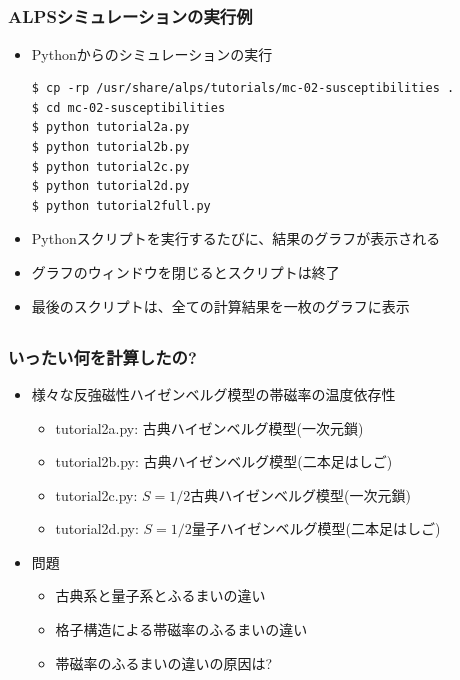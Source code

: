 \subsection*{\redm\whiteb\greenb}
\begin{frame}[t,fragile]
  \frametitle{ALPSシミュレーションの実行例}
  \begin{itemize}
    \item Pythonからのシミュレーションの実行
\begin{lstlisting}
$ cp -rp /usr/share/alps/tutorials/mc-02-susceptibilities .
$ cd mc-02-susceptibilities  
$ python tutorial2a.py
$ python tutorial2b.py
$ python tutorial2c.py
$ python tutorial2d.py
$ python tutorial2full.py
\end{lstlisting}
    \item Pythonスクリプトを実行するたびに、結果のグラフが表示される
    \item グラフのウィンドウを閉じるとスクリプトは終了
    \item 最後のスクリプトは、全ての計算結果を一枚のグラフに表示
  \end{itemize}
\end{frame}

\subsection*{\redm\whiteb\greenb}
\begin{frame}[t,fragile]
  \frametitle{いったい何を計算したの?}
  \begin{itemize}
  \item 様々な反強磁性ハイゼンベルグ模型の帯磁率の温度依存性
    \begin{itemize}
    \item tutorial2a.py: 古典ハイゼンベルグ模型(一次元鎖)
    \item tutorial2b.py: 古典ハイゼンベルグ模型(二本足はしご)
    \item tutorial2c.py: $S=1/2$古典ハイゼンベルグ模型(一次元鎖)
    \item tutorial2d.py: $S=1/2$量子ハイゼンベルグ模型(二本足はしご)
    \end{itemize}
  \item 問題
    \begin{itemize}
      \item 古典系と量子系とふるまいの違い
      \item 格子構造による帯磁率のふるまいの違い
      \item 帯磁率のふるまいの違いの原因は?
    \end{itemize}
  \end{itemize}
\end{frame}


